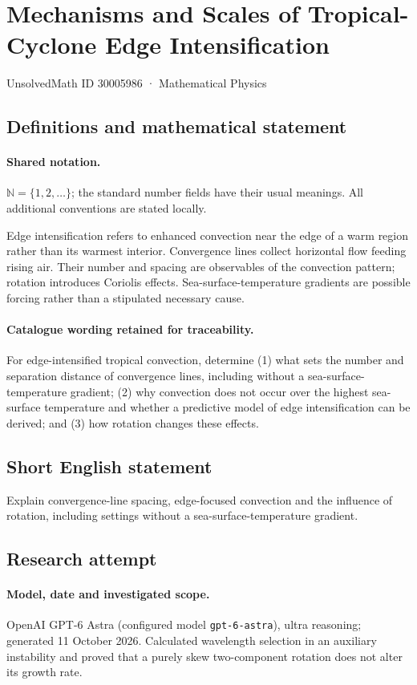 \documentclass[11pt]{article}
\begin{document}
\setcounter{section}{30005985}
\section{Mechanisms and Scales of Tropical-Cyclone Edge Intensification}\label{30005986}
{\small UnsolvedMath ID 30005986 · Mathematical Physics}
\subsection{Definitions and mathematical statement}

\paragraph{Shared notation.}$\mathbb N=\{1,2,\ldots\}$; the standard number fields have their usual meanings. All additional conventions are stated locally.


Edge intensification refers to enhanced convection near the edge of a warm region rather than its warmest interior. Convergence lines collect horizontal flow feeding rising air. Their number and spacing are observables of the convection pattern; rotation introduces Coriolis effects. Sea-surface-temperature gradients are possible forcing rather than a stipulated necessary cause.

\paragraph{Catalogue wording retained for traceability.}
For edge-intensified tropical convection, determine (1) what sets the number and separation distance of convergence lines, including without a sea-surface-temperature gradient; (2) why convection does not occur over the highest sea-surface temperature and whether a predictive model of edge intensification can be derived; and (3) how rotation changes these effects.
\subsection{Short English statement}
Explain convergence-line spacing, edge-focused convection and the influence of rotation, including settings without a sea-surface-temperature gradient.
\subsection{Research attempt}
\paragraph{Model, date and investigated scope.}
OpenAI GPT-6 Astra (configured model \texttt{gpt-6-astra}), ultra reasoning; generated 11 October 2026. Calculated wavelength selection in an auxiliary instability and proved that a purely skew two-component rotation does not alter its growth rate.
\end{document}
